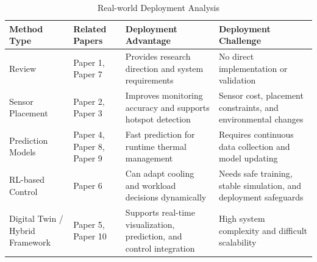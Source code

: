 \documentclass[12pt,a4paper]{article}
\begin{document}
                    \begin{table}[H]
                    \centering
                    \caption{Real-world Deployment Analysis}
                    \label{tab:deployment_analysis}
                    \begin{tabular}{p{3cm} p{4cm} p{4cm} p{4cm}}
                    \toprule
                    Method Type & Related Papers & Deployment Advantage & Deployment Challenge \\
                    \midrule
                    Review & Paper 1, Paper 7 & Provides research direction and system requirements & No direct implementation or validation \\
                    
                    Sensor Placement & Paper 2, Paper 3 & Improves monitoring accuracy and supports hotspot detection & Sensor cost, placement constraints, and environmental changes \\
                    
                    Prediction Models & Paper 4, Paper 8, Paper 9 & Fast prediction for runtime thermal management & Requires continuous data collection and model updating \\
                    
                    RL-based Control & Paper 6 & Can adapt cooling and workload decisions dynamically & Needs safe training, stable simulation, and deployment safeguards \\
                    
                    Digital Twin / Hybrid Framework & Paper 5, Paper 10 & Supports real-time visualization, prediction, and control integration & High system complexity and difficult scalability \\
                    \bottomrule
                    \end{tabular}
                    \end{table}
                    
\end{document}
